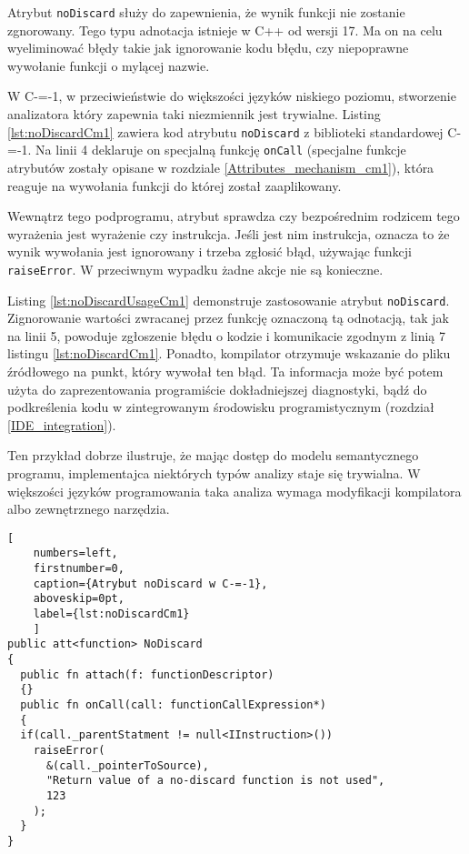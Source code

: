 Atrybut \lstinline{noDiscard} służy do zapewnienia, że wynik funkcji nie zostanie zgnorowany.
Tego typu adnotacja istnieje w C++ od wersji 17.
Ma on na celu wyeliminować błędy takie jak ignorowanie kodu błędu, czy niepoprawne wywołanie funkcji o mylącej nazwie.

W C-=-1, w przeciwieństwie do większości języków niskiego poziomu, stworzenie analizatora który zapewnia taki niezmiennik jest trywialne.
Listing \ref{lst:noDiscardCm1} zawiera kod atrybutu \lstinline{noDiscard} z biblioteki standardowej C-=-1.
Na linii 4 deklaruje on specjalną funkcję \lstinline{onCall} (specjalne funkcje atrybutów zostały opisane w rozdziale \ref{Attributes_mechanism_cm1}), która reaguje na wywołania funkcji do której został zaaplikowany.

Wewnątrz tego podprogramu, atrybut sprawdza czy bezpośrednim rodzicem tego wyrażenia jest wyrażenie czy instrukcja.
Jeśli jest nim instrukcja, oznacza to że wynik wywołania jest ignorowany i trzeba zgłosić błąd, używając funkcji \lstinline{raiseError}.
W przeciwnym wypadku żadne akcje nie są konieczne.

Listing \ref{lst:noDiscardUsageCm1} demonstruje zastosowanie atrybut \lstinline{noDiscard}.
Zignorowanie wartości zwracanej przez funkcję oznaczoną tą odnotacją, tak jak na linii 5, powoduje zgłoszenie błędu o kodzie i komunikacie zgodnym z linią 7 listingu \ref{lst:noDiscardCm1}.
Ponadto, kompilator otrzymuje wskazanie do pliku źródłowego na punkt, który wywołał ten błąd.
Ta informacja może być potem użyta do zaprezentowania programiście dokładniejszej diagnostyki, bądź do podkreślenia kodu w zintegrowanym środowisku programistycznym (rozdział \ref{IDE_integration}).

Ten przykład dobrze ilustruje, że mając dostęp do modelu semantycznego programu, implementajca niektórych typów analizy staje się trywialna.
W większości języków programowania taka analiza wymaga modyfikacji kompilatora albo zewnętrznego narzędzia.

\begin{minipage}{\linewidth}
  
  \begin{lstlisting}[
    numbers=left,
    firstnumber=0,
    caption={Atrybut noDiscard w C-=-1},
    aboveskip=0pt,
    label={lst:noDiscardCm1}
    ]
public att<function> NoDiscard
{
  public fn attach(f: functionDescriptor)
  {}
  public fn onCall(call: functionCallExpression*)
  {
  if(call._parentStatment != null<IInstruction>())
    raiseError(
      &(call._pointerToSource), 
      "Return value of a no-discard function is not used",
      123
    );
  }
}
\end{lstlisting}
\end{minipage}



